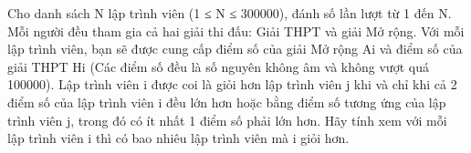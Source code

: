 Cho danh sách N lập trình viên (1 ≤ N ≤ 300000), đánh số lần lượt từ 1 đến N. Mỗi người đều tham gia cả hai giải thi đấu: Giải THPT và giải Mở rộng. Với mỗi lập trình viên, bạn sẽ được cung cấp điểm số của giải Mở rộng Ai và điểm số của giải THPT Hi (Các điểm số đều là số nguyên không âm và không vượt quá 100000). Lập trình viên i được coi là giỏi hơn lập trình viên j khi và chỉ khi cả 2 điểm số của lập trình viên i đều lớn hơn hoặc bằng điểm số tương ứng của lập trình viên j, trong đó có ít nhất 1 điểm số phải lớn hơn. Hãy tính xem với mỗi lập trình viên i thì có bao nhiêu lập trình viên mà i giỏi hơn.